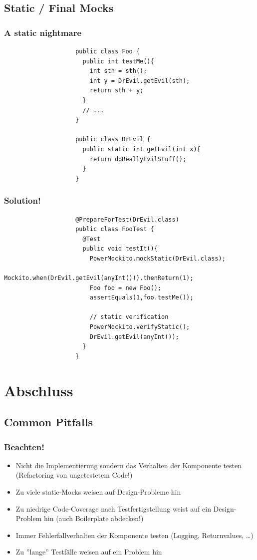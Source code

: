 \documentclass{beamer}
\begin{document}
		\subsection{Static / Final Mocks}

			\begin{frame}[fragile]
				\frametitle{A static nightmare}

				\begin{lstlisting}
					public class Foo {
					  public int testMe(){
					    int sth = sth();
					    int y = DrEvil.getEvil(sth);	
					    return sth + y;
					  }
					  // ...
					}

					public class DrEvil {
					  public static int getEvil(int x){
					    return doReallyEvilStuff();
					  }
					}
				\end{lstlisting}
			\end{frame}

			\begin{frame}[fragile]
				\frametitle{Solution!}

				\begin{lstlisting}
					@PrepareForTest(DrEvil.class)
					public class FooTest {
					  @Test
					  public void testIt(){
					    PowerMockito.mockStatic(DrEvil.class);
					    Mockito.when(DrEvil.getEvil(anyInt())).thenReturn(1);
					    Foo foo = new Foo();
					    assertEquals(1,foo.testMe());

					    // static verification
					    PowerMockito.verifyStatic();
					    DrEvil.getEvil(anyInt());
					  }
					}
				\end{lstlisting}
			\end{frame}



	\logo{}
	\section{Abschluss}

		\subsection{Common Pitfalls}

			\begin{frame}
				\frametitle{Beachten!}

				\begin{itemize}
					\item{Nicht die Implementierung sondern das Verhalten der Komponente testen (Refactoring von ungetestetem Code!)}
					\pause
					\item{Zu viele static-Mocks weisen auf Design-Probleme hin}
					\pause
					\item{Zu niedrige Code-Coverage nach Testfertigstellung weist auf ein Design-Problem hin (auch Boilerplate abdecken!)}
					\pause
					\item{Immer Fehlerfallverhalten der Komponente testen (Logging, Returnvalues, \ldots)}
					\pause
					\item{Zu ''lange'' Testfälle weisen auf ein Problem hin}
				\end{itemize}
			\end{frame}
\end{document}

